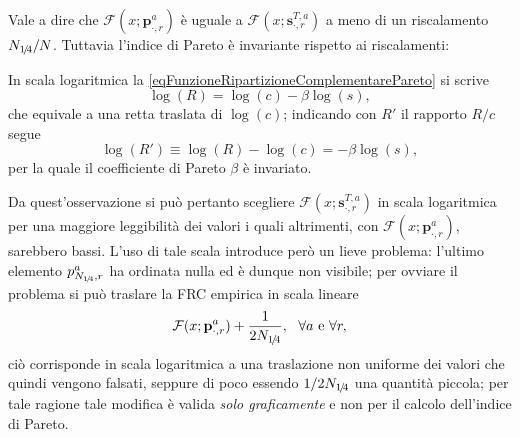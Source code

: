                 Vale a dire che \(\mathcal F(x;\mathbf p^a_{\cdot,r})\) è uguale a \(\mathcal F(x;\mathbf s^{T,a}_{\cdot,r})\) a meno di un riscalamento \(N_{1\hspace{-0.15em}/\hspace{-0.15em}4}/N\). Tuttavia l'indice di Pareto è invariante rispetto ai riscalamenti:
                
                \begin{oss}
                    In scala logaritmica la \cref{eqFunzioneRipartizioneComplementarePareto} si scrive
                    \begin{equation*}
                        \log(R)=\log(c)-\beta\log(s),
                    \end{equation*}
                    che equivale a una retta traslata di \(\log(c)\); indicando con \(R'\) il rapporto \(R/c\) segue
                    \begin{equation*}
                        \log(R')\equiv\log(R)-\log(c)=-\beta\log(s),
                    \end{equation*}
                    per la quale il coefficiente di Pareto \(\beta\) è invariato.
                \end{oss}

                Da quest'osservazione si può pertanto scegliere \(\mathcal F(x;\mathbf s^{T,a}_{\cdot,r})\) in scala logaritmica per una maggiore leggibilità dei valori i quali altrimenti, con \(\mathcal F(x;\mathbf p^a_{\cdot,r})\), sarebbero bassi. L'uso di tale scala introduce però un lieve problema: l'ultimo elemento \(p^a_{N_{1\hspace{-0.15em}/\hspace{-0.15em}4},r}\) ha ordinata nulla ed è dunque non visibile; per ovviare il problema si può traslare la FRC empirica in scala lineare
                \begin{equation}
                    \label{eqFRCEmpiricaFinale}
                    \mathcal F(x;\mathbf p^a_{\cdot,r})+\frac1{2N_{1\hspace{-0.15em}/\hspace{-0.15em}4}},
                    \ \ \forall a\text{ e }\forall r,
                \end{equation}
                ciò corrisponde in scala logaritmica a una traslazione non uniforme dei valori che quindi vengono falsati, seppure di poco essendo \(1/2N_{1\hspace{-0.15em}/\hspace{-0.15em}4}\) una quantità piccola; per tale ragione tale modifica è valida \textit{solo graficamente} e non per il calcolo dell'indice di Pareto.

